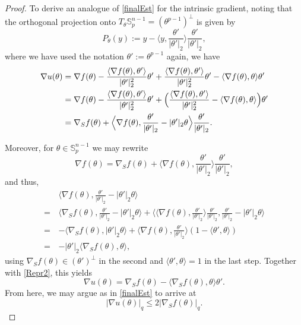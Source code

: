 \documentclass[a4paper,12pt]{amsart}
\numberwithin{equation}{section}
\theoremstyle{remark}
\def\S{{\mathbb S}}
\begin{document}
\begin{proof}
To derive an analogue of \eqref{finalEst} for the intrinsic gradient, noting that the orthogonal projection onto $T_{\theta}\S_p^{n-1} = (\theta^{p-1})^\perp$ is given by
\[
P_{\theta}(y) := y - \Big\langle y, \frac{\theta'}{\lvert \theta' \rvert_2} \Big\rangle \frac{\theta'}{\lvert \theta' \rvert_2},
\]
where we have used the notation $\theta' := \theta^{p-1}$ again, we have
\begin{align}
\nabla u(\theta) &= \nabla f(\theta) - \frac{\langle \nabla f(\theta), \theta' \rangle}{\lvert \theta'\rvert_2^2} \theta' + \frac{\langle \nabla f(\theta), \theta' \rangle}{\lvert \theta'\rvert_2^2} \theta' - \langle \nabla f(\theta), \theta \rangle \theta'\notag\\
&= \nabla f(\theta) - \frac{\langle \nabla f(\theta), \theta' \rangle}{\lvert \theta'\rvert_2^2} \theta' + \Big(\frac{\langle \nabla f(\theta), \theta' \rangle}{\lvert \theta'\rvert_2^2} - \langle \nabla f(\theta), \theta \rangle\Big) \theta'\notag\\
&= \nabla_S f(\theta) + \Big\langle \nabla f(\theta), \frac{\theta'}{\lvert \theta' \rvert_2} - \lvert \theta' \rvert_2 \theta \Big\rangle \frac{\theta'}{\lvert \theta' \rvert_2}.\label{Repr2}
\end{align}

Moreover, for $\theta \in \S_p^{n-1}$ we may rewrite
\[
\nabla f(\theta) =  \nabla_S f(\theta) + \Big\langle \nabla f(\theta), \frac{\theta'}{\lvert \theta' \rvert_2}\Big\rangle \frac{\theta'}{\lvert \theta' \rvert_2},
\]
and thus,
\begin{align*}
&\Big\langle \nabla f(\theta), \frac{\theta'}{\lvert \theta' \rvert_2} - \lvert \theta' \rvert_2 \theta \Big\rangle\\
=\, &\Big\langle \nabla_S f(\theta), \frac{\theta'}{\lvert \theta' \rvert_2} - \lvert \theta' \rvert_2 \theta \Big\rangle
   + \Big\langle \Big\langle \nabla f(\theta), \frac{\theta'}{\lvert \theta' \rvert_2}\Big\rangle \frac{\theta'}{\lvert \theta' \rvert_2}, \frac{\theta'}{\lvert \theta' \rvert_2} - \lvert \theta' \rvert_2 \theta \Big\rangle\\
   =\, &- \langle \nabla_S f(\theta), \lvert \theta' \rvert_2 \theta \rangle + \Big\langle \nabla f(\theta), \frac{\theta'}{\lvert \theta' \rvert_2}\Big\rangle (1 - \langle \theta', \theta \rangle)\\
   =\, &- \lvert \theta' \rvert_2 \langle \nabla_S f(\theta), \theta \rangle,
   \end{align*}
using $\nabla_S f(\theta) \in (\theta')^\perp$ in the second and $\langle \theta', \theta \rangle = 1$ in the last step. Together with \eqref{Repr2}, this yields
\[
\nabla u(\theta) = \nabla_S f(\theta) - \langle \nabla_S f(\theta), \theta \rangle \theta'.
\]
From here, we may argue as in \eqref{finalEst} to arrive at
\begin{equation}
\lvert \nabla u(\theta) \rvert_q \le 2 \lvert \nabla_S f(\theta) \rvert_q\label{finalEst2}.
\end{equation}


\end{proof}
\end{document}
